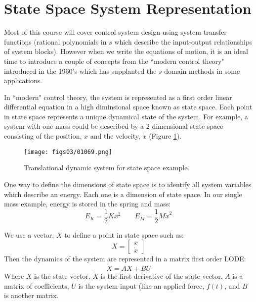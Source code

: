 \documentclass[letterpaper]{book}
\begin{document}
  

\section{State Space System Representation}
Most of this course will cover control system design using system transfer functions (rational polynomials in $s$ which describe the input-output relationships of system blocks).  However when we write the equations of motion, it is an ideal time to introduce a couple of concepts from the ``modern control theory" introduced in the 1960's which has supplanted the $s$ domain methods in some applications.  

In ``modern" control theory, the system is represented as a first order linear differential equation in a high diminsional space known as state space.  Each point in state space represents a unique dynamical state of the system.   For example, a system with one mass could be described by a 2-dimensional state space consisting of the position, $x$ and the velocity, $\dot{x}$ (Figure \ref{2Dstatespace}).

\begin{figure}\centering
\texttt{[image: figs03/01069.png]}
\caption{Translational dynamic system for state space example.}\label{2Dstatespace}
\end{figure}

One way to define the dimensions of state space is to identify all system variables which describe an energy.  Each one is a dimension of state space.   In our single mass example, energy is stored in the spring and mass:
\[
E_K = \frac{1}{2}Kx^2 \qquad E_M = \frac{1}{2}M{\dot{x}}^2
\]

We use a vector, $X$ to define a point in state space such as:
\[
X = \begin{bmatrix} x \\ \dot{x} \end{bmatrix}
\]
Then the dynamics of the system are represented in a matrix first order LODE:
\[
\dot{X} = AX+BU
\]
Where $X$ is the state vector, $\dot{X}$ is the first derivative of the state vector,
$A$ is a matrix of coefficients, $U$ is the system input (like an applied force, $f(t)$, and 
$B$ is another matrix. 
\end{document}

